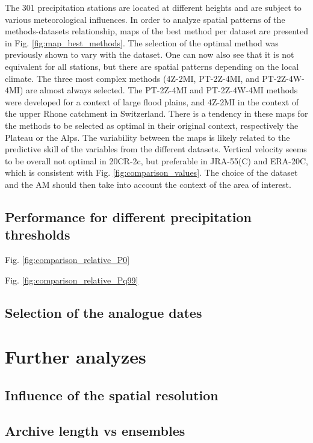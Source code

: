 \documentclass{ametsoc}
\begin{document}
The 301 precipitation stations are located at different heights and are subject to various meteorological influences. In order to analyze spatial patterns of the methods-datasets relationship, maps of the best method per dataset are presented in Fig. \ref{fig:map_best_methods}. The selection of the optimal method was previously shown to vary with the dataset. One can now also see that it is not equivalent for all stations, but there are spatial patterns depending on the local climate. The three most complex methods (4Z-2MI, PT-2Z-4MI, and PT-2Z-4W-4MI) are almost always selected. The PT-2Z-4MI and PT-2Z-4W-4MI methods were developed for a context of large flood plains, and 4Z-2MI in the context of the upper Rhone catchment in Switzerland. There is a tendency in these maps for the methods to be selected as optimal in their original context, respectively the Plateau or the Alps. The variability between the maps is likely related to the predictive skill of the variables from the different datasets. Vertical velocity seems to be overall not optimal in 20CR-2c, but preferable in JRA-55(C) and ERA-20C, which is consistent with Fig. \ref{fig:comparison_values}. The choice of the dataset and the AM should then take into account the context of the area of interest.


\subsection{Performance for different precipitation thresholds}


Fig. \ref{fig:comparison_relative_P0}

Fig. \ref{fig:comparison_relative_Pq99}


\subsection{Selection of the analogue dates}


\section{Further analyzes}
\label{sec:analyzes}

\subsection{Influence of the spatial resolution}

\subsection{Archive length vs ensembles}
\end{document}
